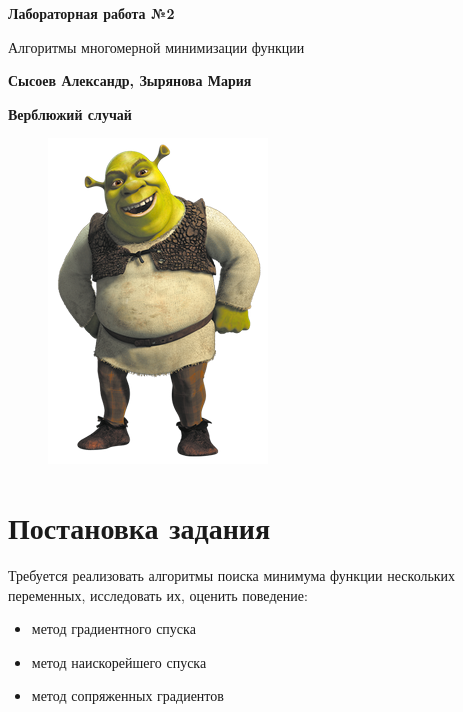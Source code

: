 \documentclass[12pt]{article}
\begin{document}
\begin{titlepage}
   \begin{center}
       \vspace*{1cm}

       \textbf{Лабораторная работа №2}

       \vspace{0.5cm}
        Алгоритмы многомерной минимизации функции
            
       \vspace{1.5cm}

       \textbf{Сысоев Александр, Зырянова Мария}
       
       \textbf{Верблюжий случай}
       
       \begin{figure}[H]
			\centering
			\includegraphics[scale=2]{img/shrek.png}
		\end{figure}

       \vfill
            
   \end{center}
\end{titlepage}



\section{Постановка задания}

Требуется реализовать алгоритмы поиска минимума функции нескольких переменных, исследовать их, оценить поведение:
\begin{itemize}
\item метод градиентного спуска
\item метод наискорейшего спуска
\item метод сопряженных градиентов
\end{itemize}
\end{document}
